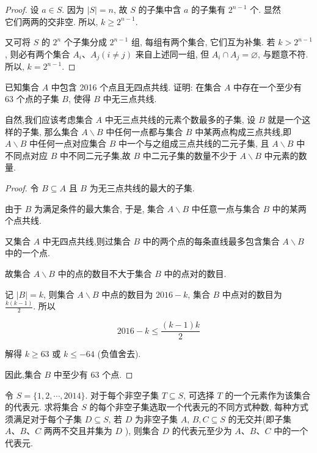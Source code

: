 \begin{proof}
	设 $a \in S$. 因为 $|S|=n$, 故 $S$ 的子集中含 $a$ 的子集有 $2^{n-1}$ 个. 显然\\
	它们两两的交非空. 所以, $k \geqslant 2^{n-1}$.

	又可将 $S$ 的 $2^{n}$ 个子集分成 $2^{n-1}$ 组, 每组有两个集合, 它们互为补集. 若 $k>2^{n-1}$, 则必有两个集合 $A_{i} 、 A_{j}(i \neq j)$ 来自上述同一组, 但 $A_{i} \cap A_{j}=\varnothing$, 与题意不符. 所以, $k=2^{n-1}$.
\end{proof}

\begin{example}
	已知集合 $A$ 中包含 2016 个点且无四点共线. 证明: 在集合 $A$ 中存在一个至少有 63 个点的子集 $B$, 使得 $B$ 中无三点共线.
\end{example}

\begin{analysis}
	自然,我们应该考虑集合 $A$ 中无三点共线的元素个数最多的子集, 设 $B$ 就是一个这样的子集, 那么集合 $A \backslash B$ 中任何一点都与集合 $B$ 中某两点构成三点共线,即 $A \backslash B$ 中任何一点对应集合 $B$ 中一个与之组成三点共线的二元子集, 且 $A \backslash B$ 中不同点对应 $B$ 中不同二元子集,故 $B$ 中二元子集的数量不少于 $A \backslash B$ 中元素的数量.
\end{analysis}

\begin{proof}
	令 $B \subseteq A$ 且 $B$ 为无三点共线的最大的子集.

	由于 $B$ 为满足条件的最大集合, 于是, 集合 $A \backslash B$ 中任意一点与集合 $B$ 中的某两个点共线.

	又集合 $A$ 中无四点共线,则过集合 $B$ 中的两个点的每条直线最多包含集合 $A \backslash B$ 中的一个点.

	故集合 $A \backslash B$ 中的点的数目不大于集合 $B$ 中的点对的数目.

	记 $|B|=k$, 则集合 $A \backslash B$ 中点的数目为 $2016-k$, 集合 $B$ 中点对的数目为 $\frac{k(k-1)}{2}$. 所以

	$$
		2016-k \leqslant \frac{(k-1) k}{2}
	$$

	解得 $k \geqslant 63$ 或 $k \leqslant-64$ (负值舍去).

	因此,集合 $B$ 中至少有 63 个点.
\end{proof}

\begin{example}
	令 $S=\{1,2, \cdots, 2014\}$. 对于每个非空子集 $T \subseteq S$, 可选择 $T$ 的一个元素作为该集合的代表元. 求将集合 $S$ 的每个非空子集选取一个代表元的不同方式种数, 每种方式须满足对于每个子集 $D \subseteq S$, 若 $D$ 为非空子集 $A$, $B, C \subseteq S$ 的无交并(即子集 $A 、 B 、 C$ 两两不交且并集为 $D$ ), 则集合 $D$ 的代表元至少为 $A 、 B 、 C$ 中的一个代表元.
\end{example}

